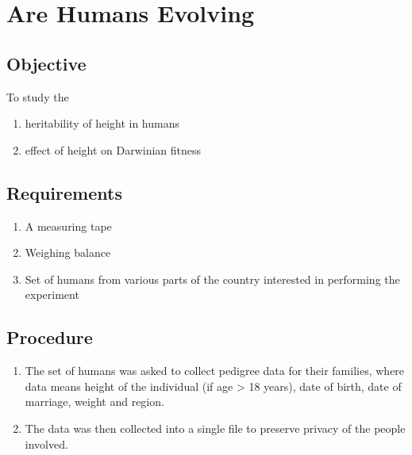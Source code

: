 \chapter{Are Humans Evolving}
\section{Objective}
To study the
\begin{enumerate}
	\item heritability of height in humans
	\item effect of height on Darwinian fitness
\end{enumerate}

\section{Requirements}
	\begin{enumerate}
		\item A measuring tape
		\item Weighing balance
		\item Set of humans from various parts of the country interested in performing the experiment
	\end{enumerate}

\section{Procedure}
	\begin{enumerate}
		\item The set of humans was asked to collect pedigree data for their families, where data means height of the individual (if age > 18 years), date of birth, date of marriage, weight and region.
		\item The data was then collected into a single file to preserve privacy of the people involved.
	\end{enumerate}

